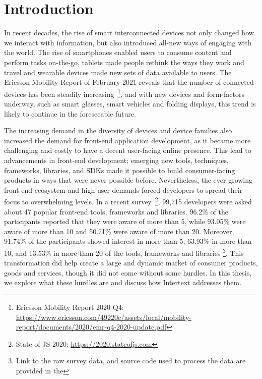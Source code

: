 
\chapter{Introduction} \label{introduction}

In recent decades, the rise of smart interconnected devices not only changed how we interact with information, but also introduced all-new ways of engaging with the world. The rise of smartphones enabled users to consume content and perform tasks on-the-go, tablets made people rethink the ways they work and travel and wearable devices made new sets of data available to users. The Ericsson Mobility Report of February 2021 reveals that the number of connected devices has been steadily increasing~\footnote{Ericsson Mobility Report 2020 Q4: \url{https://www.ericsson.com/49220c/assets/local/mobility-report/documents/2020/emr-q4-2020-update.pdf}}, and with new devices and form-factors underway, such as smart glasses, smart vehicles and folding displays, this trend is likely to continue in the foreseeable future. 

The increasing demand in the diversity of devices and device families also increased the demand for front-end application development, as it became more challenging and costly to have a decent user-facing online presence. This lead to advancements in front-end development; emerging new tools, techniques, frameworks, libraries, and SDKs made it possible to build consumer-facing products in ways that were never possible before. Nevertheless, the ever-growing front-end ecosystem and high user demands forced developers to spread their focus to overwhelming levels. In a recent survey~\footnote{State of JS 2020: \url{https://2020.stateofjs.com}}, 99,715 developers were asked about 47 popular front-end tools, frameworks and libraries. 96.2\% of the participants reported that they were aware of more than 5, while 93.05\% were aware of more than 10 and 50.71\% were aware of more than 20. Moreover, 91.74\% of the participants showed interest in more than 5, 63.93\% in more than 10, and 13.53\% in more than 20 of the tools, frameworks and libraries \footnote{Link to the raw survey data, and source code used to process the data are provided in the }. This transformation did help create a large and dynamic market of consumer products, goods and services, though it did not come without some hurdles. In this thesis, we explore what these hurdles are and discuss how Intertext addresses them.

